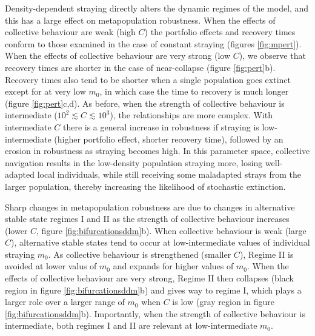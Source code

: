 \documentclass{revtex4}
\begin{document}
Density-dependent straying directly alters the dynamic regimes of the model, and this has a large effect on metapopulation robustness.
When the effects of collective behaviour are weak (high $C$) the portfolio effects and recovery times conform to those examined in the case of constant straying (figures \ref{fig:mpert}).
When the effects of collective behaviour are very strong (low $C$), we observe that recovery times are shorter in the case of near-collapse (figure \ref{fig:pert}b).
Recovery times also tend to be shorter when a single population goes extinct except for at very low $m_0$, in which case the time to recovery is much longer (figure \ref{fig:pert}c,d).
As before, when the strength of collective behaviour is intermediate ($10^{2} \lesssim C \lesssim 10^3$), the relationships are more complex.
With intermediate $C$ there is a general increase in robustness if straying is low-intermediate (higher portfolio effect, shorter recovery time), followed by an erosion in robustness as straying becomes high.
In this parameter space, collective navigation results in the low-density population straying more, losing well-adapted local individuals, while still receiving some maladapted strays from the larger population, thereby increasing the likelihood of stochastic extinction.



Sharp changes in metapopulation robustness are due to changes in alternative stable state regimes I and II as the strength of collective behaviour increases (lower $C$, figure \ref{fig:bifurcationsddm}b). 
When collective behaviour is weak (large $C$), alternative stable states tend to occur at low-intermediate values of individual straying $m_0$.
As collective behaviour is strengthened (smaller $C$), Regime II is avoided at lower valus of $m_0$ and expands for higher values of $m_0$.
When the effects of collective behaviour are very strong, Regime II then collapses (black region in figure \ref{fig:bifurcationsddm}b) and gives way to regime I, which plays a larger role over a larger range of $m_0$ when $C$ is low (gray region in figure \ref{fig:bifurcationsddm}b).
Importantly, when the strength of collective behaviour is intermediate, both regimes I and II are relevant at low-intermediate $m_0$.
\end{document}
